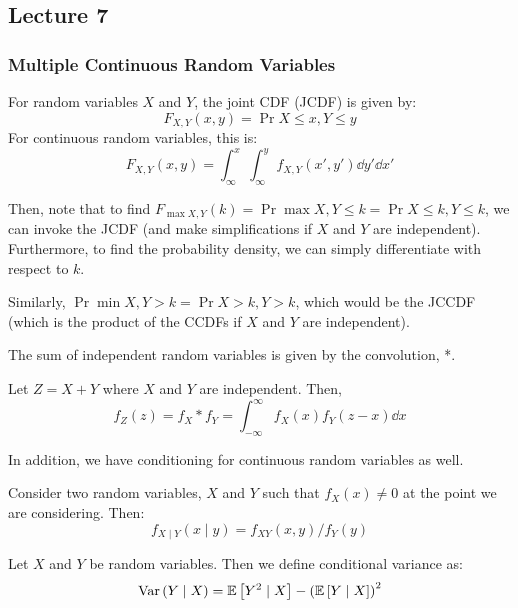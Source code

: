 \subsection{Lecture 7}

\subsubsection{Multiple Continuous Random Variables}

\begin{definition} [JCDF]
    For random variables $X$ and $Y$, the joint CDF (JCDF) is given by:
    \[ F_{X, Y}(x, y) = \Pr{X \leq x, Y \leq y} \] 
    For continuous random variables, this is:
    \[ F_{X,Y}(x, y) = \int_{\infty}^x \int_{\infty}^y f_{X, Y}(x', y') \dd{y'} \dd{x'} \]
\end{definition}

Then, note that to find $F_{\max{X, Y}}(k) = \Pr{\max{X, Y} \leq k} = \Pr{X \leq k, Y \leq k}$, we can invoke the JCDF (and make simplifications if $X$ and $Y$ are independent).
Furthermore, to find the probability density, we can simply differentiate with respect to $k$.

Similarly, $\Pr{\min{X, Y} > k} = \Pr{X > k, Y > k}$, which would be the JCCDF (which is the product of the CCDFs if $X$ and $Y$ are independent).

The sum of independent random variables is given by the convolution, *.
\begin{theorem} [Convolution]
    Let $Z = X + Y$ where $X$ and $Y$ are independent. Then,
    \[ f_Z(z) = f_X * f_Y = \int_{-\infty}^{\infty} f_X(x) f_Y(z - x) \dd{x} \]
\end{theorem}

In addition, we have conditioning for continuous random variables as well.
\begin{definition}
    Consider two random variables, $X$ and $Y$ such that $f_X(x) \neq 0$ at the point we are considering. Then:
    \[ f_{X \mid Y}(x \mid y) = f_{XY}(x, y)/f_{Y}(y) \]
\end{definition}

\begin{definition}
    Let $X$ and $Y$ be random variables. Then we define conditional variance as:
    \[ \text{Var}\left( Y \mid X \right) = \mathbb{E}\left[ Y^2 \mid X \right] - \qty(\mathbb{E}\left[ Y \mid X \right])^2 \]
\end{definition}


